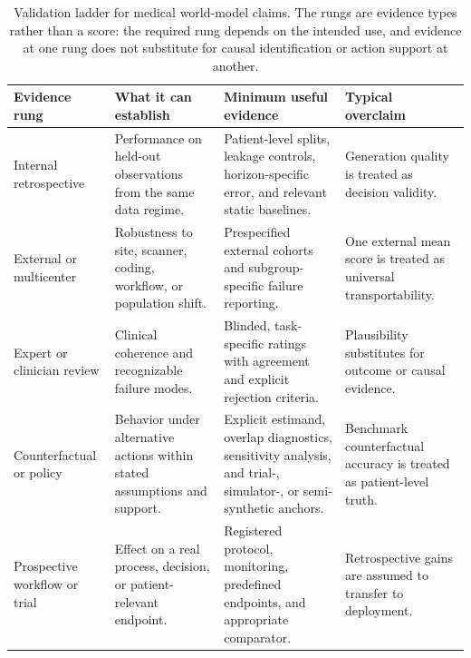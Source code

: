 \begin{table}[t]
\caption{Validation ladder for medical world-model claims. The rungs are evidence types rather than a score: the required rung depends on the intended use, and evidence at one rung does not substitute for causal identification or action support at another.}
\label{tab:validation-pyramid}
\centering
\small
\setlength{\tabcolsep}{4pt}
\renewcommand{\arraystretch}{1.08}
\begin{tabularx}{\linewidth}{@{}p{2.35cm}p{3.35cm}Xp{3.25cm}@{}}
\toprule
\textbf{Evidence rung} & \textbf{What it can establish} & \textbf{Minimum useful evidence} & \textbf{Typical overclaim} \\
\midrule
Internal retrospective & Performance on held-out observations from the same data regime. & Patient-level splits, leakage controls, horizon-specific error, and relevant static baselines. & Generation quality is treated as decision validity. \\
External or multicenter & Robustness to site, scanner, coding, workflow, or population shift. & Prespecified external cohorts and subgroup-specific failure reporting. & One external mean score is treated as universal transportability. \\
Expert or clinician review & Clinical coherence and recognizable failure modes. & Blinded, task-specific ratings with agreement and explicit rejection criteria. & Plausibility substitutes for outcome or causal evidence. \\
Counterfactual or policy & Behavior under alternative actions within stated assumptions and support. & Explicit estimand, overlap diagnostics, sensitivity analysis, and trial-, simulator-, or semi-synthetic anchors. & Benchmark counterfactual accuracy is treated as patient-level truth. \\
Prospective workflow or trial & Effect on a real process, decision, or patient-relevant endpoint. & Registered protocol, monitoring, predefined endpoints, and appropriate comparator. & Retrospective gains are assumed to transfer to deployment. \\
\bottomrule
\end{tabularx}
\end{table}
